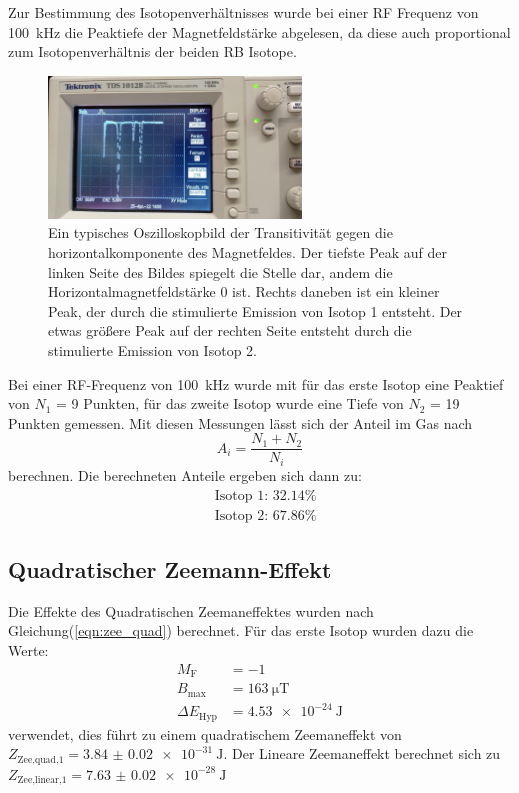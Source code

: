 		\noindent
		Zur Bestimmung des Isotopenverhältnisses wurde bei einer RF Frequenz von \SI{100}{\kilo\hertz} die Peaktiefe der Magnetfeldstärke abgelesen,
		da diese auch proportional zum Isotopenverhältnis der beiden RB Isotope.
		
		\begin{figure}[H]
			\centering
			\includegraphics[width=0.6\textwidth]{latex/images/Messbild.jpeg}
			\caption{Ein typisches Oszilloskopbild der Transitivität gegen die horizontalkomponente des Magnetfeldes. 
			Der tiefste Peak auf der linken Seite des Bildes spiegelt die Stelle dar, andem die Horizontalmagnetfeldstärke 0 ist.
			Rechts daneben ist ein kleiner Peak, der durch die stimulierte Emission von Isotop 1 entsteht. 
			Der etwas größere Peak auf der rechten Seite entsteht durch die stimulierte Emission von Isotop 2.}
		\end{figure}

		Bei einer RF-Frequenz von \SI{100}{\kilo\hertz} wurde mit für das erste Isotop eine Peaktief von $N_1$ = 9 Punkten, für das zweite Isotop wurde eine Tiefe von $N_2$ = 19 Punkten gemessen.
		Mit diesen Messungen lässt sich der Anteil im Gas nach 
		\begin{equation}
			A_i = \frac{N_1 + N_2}{N_i}
		\end{equation}
		berechnen.
		Die berechneten Anteile ergeben sich dann zu:
		\begin{align*}
			&\text{Isotop 1: } \num{32.14}\%\\
			&\text{Isotop 2: } \num{67.86}\%
		\end{align*}

	
	\subsection{Quadratischer Zeemann-Effekt}

		Die Effekte des Quadratischen Zeemaneffektes wurden nach Gleichung(\ref{eqn:zee_quad}) berechnet.
		Für das erste Isotop wurden dazu die Werte:
		\begin{align*}
			M_\text{F} &= -1\\
			B_\text{max} &= \SI{163}{\micro\tesla}\\
			\Delta E_\text{Hyp} &= \SI{4.53 e-24}{\joule}
		\end{align*}
		verwendet, dies führt zu einem quadratischem Zeemaneffekt von $Z_\text{Zee,quad,1} = \SI{3.84(2)e-31}{\joule}.$
		Der Lineare Zeemaneffekt berechnet sich zu $Z_\text{Zee,linear,1} = \SI{7.63(2)e-28}{\joule}$

